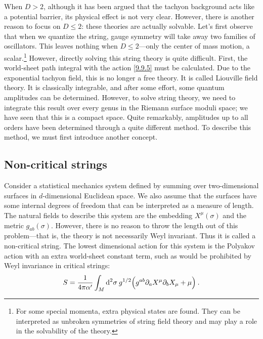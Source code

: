 When $D>2$, although it has been argued that the tachyon background acts like a potential barrier, its physical effect is not very clear. 
However, there is another reason to focus on $D \leq 2$: these theories are actually solvable.
Let's first observe that when we quantize the string, gauge symmetry will take away two families of oscillators. 
This leaves nothing when $D \leq 2$—only the center of mass motion, a scalar.\footnote{For some special momenta, extra physical states are found. They can be interpreted as unbroken symmetries of string field theory and may play a role in the solvability of the theory.} However, directly solving this string theory is quite difficult. First, the world-sheet path integral with the action \eqref{9.9.5} must be calculated. 
Due to the exponential tachyon field, this is no longer a free theory. It is called Liouville field theory.
It is classically integrable, and after some effort, some quantum amplitudes can be determined. 
However, to solve string theory, we need to integrate this result over every genus in the Riemann surface moduli space; we have seen that this is a compact space. 
Quite remarkably, amplitudes up to all orders have been determined through a quite different method. To describe this method, we must first introduce another concept.

\subsection*{Non-critical strings}

Consider a statistical mechanics system defined by summing over two-dimensional surfaces in $d$-dimensional Euclidean space. We also assume that the surfaces have some internal degrees of freedom that can be interpreted as a measure of length.
The natural fields to describe this system are the embedding $X^{\mu}(\sigma)$ and the metric $g_{a b}(\sigma)$. However, there is no reason to throw the length out of this problem—that is, the theory is not necessarily Weyl invariant. 
Thus it is called a non-critical string. The lowest dimensional action for this system is the Polyakov action with an extra world-sheet constant term, such as would be prohibited by Weyl invariance in critical strings:
\begin{equation}
	S=\frac{1}{4 \pi \alpha^{\prime}} \int_{M} \mathrm{d}^{2} \sigma \: g^{1/2} 
	\Bigl(g^{ab} \partial_{a} X^{\mu} \partial_{b} X_{\mu}+\mu\Bigr) \:.
	\label{9.9.6}
\end{equation}

